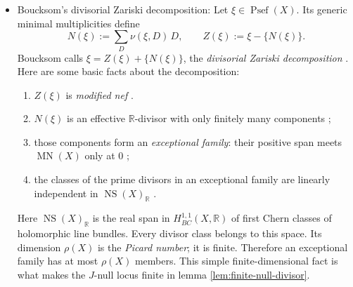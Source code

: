\documentclass[reqno]{amsart}
\theoremstyle{remark}
\def\R{\mathbb{R}}
\newcommand{\Psef}{\operatorname{Psef}}
\newcommand{\MN}{\operatorname{MN}}
\newcommand{\NS}{\operatorname{NS}}
\theoremstyle{plain}
\begin{document}
\begin{itemize}
Here $\mu_*\widehat\eta$ means: choose a K\"ahler form
$\widehat\theta\in\widehat\eta$, push it forward as a current, and take
the resulting cohomology class on $X$.  Although
$\mu_*\widehat\theta$ need not be smooth at the exceptional image, it is
a K\"ahler current and has zero generic Lelong number on every divisor,
because the singular-value locus of a modification has codimension at
least two.Combining with \eqref{eq:add-kahler}, we get exactly the form used later:
\begin{equation}\label{eq:boucksom-used}
 \gamma\in\MN(X),\ \delta>0
 \quad\Longrightarrow\quad
 \gamma+\delta h=\mu_{\delta *}\widehat h_\delta
\end{equation}
for a modification $\mu_\delta:Y_\delta\to X$ and a K\"ahler class
$\widehat h_\delta$ on $Y_\delta$.
 \item Boucksom's divisorial Zariski decomposition: Let $\xi\in\Psef(X)$.  Its generic minimal multiplicities define
\[
 N(\xi):=\sum_D\nu(\xi,D)\,D,\qquad
 Z(\xi):=\xi-\{N(\xi)\}.
\]
Boucksom calls $
 \xi=Z(\xi)+\{N(\xi)\}$, 
the \emph{divisorial Zariski decomposition}
\cite[Definition~3.7]{B04}. Here are some basic facts about the decomposition: \begin {enumerate}
    \item $Z(\xi)$ is \emph{modified nef} \cite[Proposition 3.8(i)]{B04}.
    \item $N(\xi)$ is an effective $\R$-divisor with only finitely many
      components
      \cite[Theorem~3.12(i)]{B04};
      \item those components form an \emph{exceptional family}: their positive
      span meets $\MN(X)$ only at $0$
      \cite[Definition~3.10 and Proposition~3.11]{B04};
\item the classes of the prime divisors in an exceptional family are
      linearly independent in $\NS(X)_\R$
      \cite[Proposition~3.11(iii)]{B04}.
\end{enumerate}
Here $\NS(X)_\R$ is the real span in $H^{1,1}_{BC}(X,\R)$ of first
Chern classes of holomorphic line bundles.  Every divisor class belongs
to this space.  Its dimension
$\rho(X)$ is the \emph{Picard number}; it is finite.  Therefore an exceptional family has at most
$\rho(X)$ members.  This simple finite-dimensional fact is what makes
the $J$-null locus finite in lemma \ref{lem:finite-null-divisor}.


\end{itemize}
\end{document}

